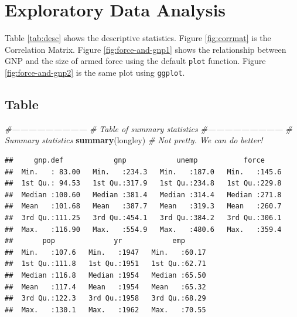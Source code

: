 \documentclass[11pt,]{article}
\newenvironment{Shaded}{\begin{snugshade}}{\end{snugshade}}
\newcommand{\KeywordTok}[1]{\textcolor[rgb]{0.13,0.29,0.53}{\textbf{#1}}}
\newcommand{\CommentTok}[1]{\textcolor[rgb]{0.56,0.35,0.01}{\textit{#1}}}
\newcommand{\NormalTok}[1]{#1}
\begin{document}
\normalsize

\clearpage

\section{Exploratory Data Analysis}\label{exploratory-data-analysis}

Table \ref{tab:desc} shows the descriptive statistics. Figure
\ref{fig:corrmat} is the Correlation Matrix. Figure
\ref{fig:force-and-gnp1} shows the relationship between GNP and the size
of armed force using the default \texttt{plot} function. Figure
\ref{fig:force-and-gnp2} is the same plot using \texttt{ggplot}.

\subsection{Table}\label{table}

\tiny

\begin{Shaded}
\begin{Highlighting}[]
\CommentTok{#---------------------------}
\CommentTok{# Table of summary statistics}
\CommentTok{#---------------------------}
  \CommentTok{# Summary statistics}
    \KeywordTok{summary}\NormalTok{(longley)  }
    \CommentTok{# Not pretty. We can do better!}
\end{Highlighting}
\end{Shaded}

\begin{verbatim}
##     gnp.def            gnp            unemp           force      
##  Min.   : 83.00   Min.   :234.3   Min.   :187.0   Min.   :145.6  
##  1st Qu.: 94.53   1st Qu.:317.9   1st Qu.:234.8   1st Qu.:229.8  
##  Median :100.60   Median :381.4   Median :314.4   Median :271.8  
##  Mean   :101.68   Mean   :387.7   Mean   :319.3   Mean   :260.7  
##  3rd Qu.:111.25   3rd Qu.:454.1   3rd Qu.:384.2   3rd Qu.:306.1  
##  Max.   :116.90   Max.   :554.9   Max.   :480.6   Max.   :359.4  
##       pop              yr            emp       
##  Min.   :107.6   Min.   :1947   Min.   :60.17  
##  1st Qu.:111.8   1st Qu.:1951   1st Qu.:62.71  
##  Median :116.8   Median :1954   Median :65.50  
##  Mean   :117.4   Mean   :1954   Mean   :65.32  
##  3rd Qu.:122.3   3rd Qu.:1958   3rd Qu.:68.29  
##  Max.   :130.1   Max.   :1962   Max.   :70.55
\end{verbatim}

\normalsize

\tiny
\end{document}
